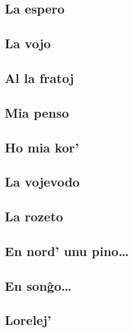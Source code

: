 \documentclass[a5paper,11pt,openany,twoside,leqno]{book}
\begin{document}
\subsection{La espero}
\label{laespero}


\subsection{La vojo}
\label{lavojo}


\subsection{Al la fratoj}
\label{allafratoj}


\subsection{Mia penso}
\label{miapenso}


\subsection{Ho mia kor'}
\label{homiakor}


\subsection{La vojevodo}
\label{vojevodo}


\subsection{La rozeto} %
\label{rozeto}


\subsection{En nord' unu pino\dots}
\label{unupino}


\newpage %

\subsection{En son\^go\dots}
\label{songxo}


\subsection{Lorelej'} %
\label{lorelej}

\end{document}
